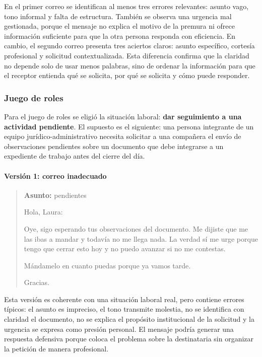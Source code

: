 En el primer correo se identifican al menos tres errores relevantes: asunto vago, tono informal y falta de estructura. También se observa una urgencia mal gestionada, porque el mensaje no explica el motivo de la premura ni ofrece información suficiente para que la otra persona responda con eficiencia. En cambio, el segundo correo presenta tres aciertos claros: asunto específico, cortesía profesional y solicitud contextualizada. Esta diferencia confirma que la claridad no depende solo de usar menos palabras, sino de ordenar la información para que el receptor entienda qué se solicita, por qué se solicita y cómo puede responder.

\subsubsection{Juego de roles}

Para el juego de roles se eligió la situación laboral: \textbf{dar seguimiento a una actividad pendiente}. El supuesto es el siguiente: una persona integrante de un equipo jurídico-administrativo necesita solicitar a una compañera el envío de observaciones pendientes sobre un documento que debe integrarse a un expediente de trabajo antes del cierre del día.

\paragraph{Versión 1: correo inadecuado}

\begin{quote}
\textbf{Asunto:} pendientes

Hola, Laura:

Oye, sigo esperando tus observaciones del documento. Me dijiste que me las ibas a mandar y todavía no me llega nada. La verdad sí me urge porque tengo que cerrar esto hoy y no puedo avanzar si no me contestas.

Mándamelo en cuanto puedas porque ya vamos tarde.

Gracias.
\end{quote}

Esta versión es coherente con una situación laboral real, pero contiene errores típicos: el asunto es impreciso, el tono transmite molestia, no se identifica con claridad el documento, no se explica el propósito institucional de la solicitud y la urgencia se expresa como presión personal. El mensaje podría generar una respuesta defensiva porque coloca el problema sobre la destinataria sin organizar la petición de manera profesional.

